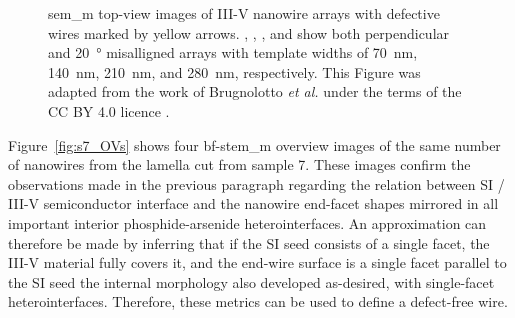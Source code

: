 \begin{figure}
{    }
    \caption[\acs{sem_m} images of nanowire arrays.]{\acs{sem_m} top-view images of III-V nanowire arrays with defective wires marked by yellow arrows. , , , and  show both perpendicular and \qty{20}{\degree} misalligned arrays with template widths of \qty{70}{nm}, \qty{140}{nm}, \qty{210}{nm}, and \qty{280}{nm}, respectively. This Figure was adapted from the work of Brugnolotto \textit{et al.} \cite{Brugnolotto2023_2} under the terms of the CC BY 4.0 licence \cite{CCBY40}.}
    \label{fig:s7_arrays}
\end{figure}

Figure~\ref{fig:s7_OVs} shows four \acs{bf}-\acs{stem_m} overview images of the same number of nanowires from the lamella cut from sample 7. These images confirm the observations made in the previous paragraph regarding the relation between \acf{SI} / III-V semiconductor interface and the nanowire end-facet shapes mirrored in all important interior phosphide-arsenide heterointerfaces. An approximation can therefore be made by inferring that if the \acl{SI} seed consists of a single  facet, the III-V material fully covers it, and the end-wire surface is a single  facet parallel to the \acl{SI} seed the internal morphology also developed as-desired, with  single-facet heterointerfaces. Therefore, these metrics can be used to define a defect-free wire.


